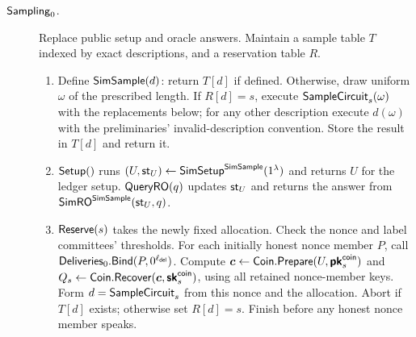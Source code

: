 \begin{description}
\item[$\mathsf{Sampling}_0$.]\label{hook:sampling}
 Replace public setup and oracle answers.  Maintain a sample table $T$
 indexed by exact descriptions, and a reservation table $R$.
 \begin{enumerate}
 \item Define $\mathsf{SimSample}(d)$: return $T[d]$ if defined.  Otherwise,
   draw uniform $\omega$ of the prescribed length.  If $R[d]=s$, execute
   $\mathsf{SampleCircuit}_s(\omega)$ with the replacements below; for any
   other description execute $d(\omega)$ with the preliminaries'
   invalid-description convention.
   Store the result in $T[d]$ and return it.
 \item $\mathsf{Setup}()$ runs
   $(U,\mathsf{st}_U)\mathrel{\leftarrow}\mathsf{SimSetup}^{\mathsf{SimSample}}(1^\lambda)$
   and returns $U$ for the ledger setup.  $\mathsf{QueryRO}(q)$ updates
   $\mathsf{st}_U$ and returns the answer from
   $\mathsf{SimRO}^{\mathsf{SimSample}}(\mathsf{st}_U,q)$.
 \item $\mathsf{Reserve}(s)$ takes the newly fixed allocation.  Check the
   nonce and label committees' thresholds.  For each initially honest
   nonce member $P$, call
   $\mathsf{Deliveries}_0.\mathsf{Bind}(P,0^{\ell_{\mathsf{del}}})$.
   Compute $\boldsymbol c\gets
   \mathsf{Coin}.\mathsf{Prepare}(U,\boldsymbol{\mathsf{pk}}^{\mathsf{coin}}_s)$ and
   $Q_s\gets\mathsf{Coin}.\mathsf{Recover}(\boldsymbol c,\boldsymbol{\mathsf{sk}}^{\mathsf{coin}}_s)$,
   using all retained nonce-member keys.  Form $d=\mathsf{SampleCircuit}_s$ from
   this nonce and the allocation.  Abort if $T[d]$ exists; otherwise
   set $R[d]=s$.  Finish before any honest nonce member speaks.
 \end{enumerate}


\end{description}
